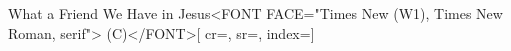 {What a Friend We Have in Jesus<FONT FACE="Times New (W1), Times New Roman, serif"> (C)</FONT>}[
    cr={},
    sr={},
    index={}]
